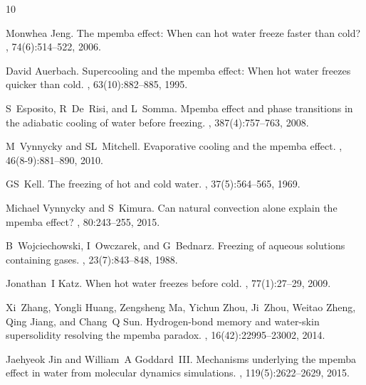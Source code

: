 \documentclass[a4paper,draft,aps,prl,preprint,superscriptaddress,nofootinbib]{revtex4}
\begin{document}
		
%		
%		
\begin{thebibliography}{10}
	
	Monwhea Jeng.
	\newblock The mpemba effect: When can hot water freeze faster than cold?
	, 74(6):514--522, 2006.
	
	David Auerbach.
	\newblock Supercooling and the mpemba effect: When hot water freezes quicker
	than cold.
	, 63(10):882--885, 1995.
	
	S~Esposito, R~De~Risi, and L~Somma.
	\newblock Mpemba effect and phase transitions in the adiabatic cooling of water
	before freezing.
	,
	387(4):757--763, 2008.
	
	M~Vynnycky and SL~Mitchell.
	\newblock Evaporative cooling and the mpemba effect.
	, 46(8-9):881--890, 2010.
	
	GS~Kell.
	\newblock The freezing of hot and cold water.
	, 37(5):564--565, 1969.
	
	Michael Vynnycky and S~Kimura.
	\newblock Can natural convection alone explain the mpemba effect?
	, 80:243--255,
	2015.
	
	B~Wojciechowski, I~Owczarek, and G~Bednarz.
	\newblock Freezing of aqueous solutions containing gases.
	, 23(7):843--848, 1988.
	
	Jonathan~I Katz.
	\newblock When hot water freezes before cold.
	, 77(1):27--29, 2009.
	
	Xi~Zhang, Yongli Huang, Zengsheng Ma, Yichun Zhou, Ji~Zhou, Weitao Zheng, Qing
	Jiang, and Chang~Q Sun.
	\newblock Hydrogen-bond memory and water-skin supersolidity resolving the
	mpemba paradox.
	, 16(42):22995--23002, 2014.
	
	Jaehyeok Jin and William~A Goddard~III.
	\newblock Mechanisms underlying the mpemba effect in water from molecular
	dynamics simulations.
	, 119(5):2622--2629, 2015.
	

\end{thebibliography}
\end{document}
